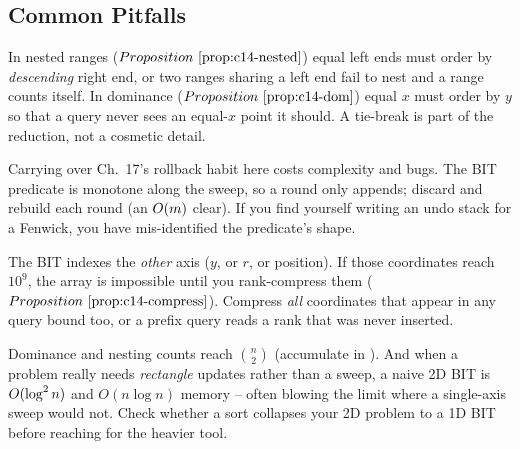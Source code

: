 \subsection{Common Pitfalls}

\begin{warningbox}
In nested ranges (\(\propref{c14-nested}\)) equal left ends must order by
\emph{descending} right end, or two ranges sharing a left end fail to nest and
a range counts itself.  In dominance (\(\propref{c14-dom}\)) equal \(x\) must
order by \(y\) so that a query never sees an equal-\(x\) point it should.  A
tie-break is part of the reduction, not a cosmetic detail.
\end{warningbox}

\begin{warningbox}
Carrying over Ch.~17's rollback habit here costs complexity and bugs.  The BIT
predicate is monotone along the sweep, so a round only appends; discard and
rebuild each round (an \(O(m)\) clear).  If you find yourself writing an
undo stack for a Fenwick, you have mis-identified the predicate's shape.
\end{warningbox}

\begin{warningbox}
The BIT indexes the \emph{other} axis (\(y\), or \(r\), or position).  If those
coordinates reach \(10^9\), the array is impossible until you rank-compress
them (\(\propref{c14-compress}\)).  Compress \emph{all} coordinates that appear
in any query bound too, or a prefix query reads a rank that was never inserted.
\end{warningbox}

\begin{warningbox}
Dominance and nesting counts reach \(\binom{n}{2}\) (accumulate in ).  And when a problem really needs \emph{rectangle} updates rather than a
sweep, a naive 2D BIT is \(O(\log^2 n)\) and \(O(n\log n)\) memory -- often
blowing the limit where a single-axis sweep would not.  Check whether a sort
collapses your 2D problem to a 1D BIT before reaching for the heavier tool.
\end{warningbox}

